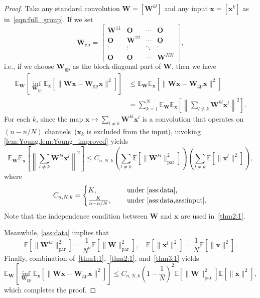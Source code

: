 \documentclass[10pt,a4paper]{amsart}
\numberwithin{equation}{section}
\theoremstyle{remark}
\newcommand\bO{\mathbf{O}}
\newcommand\bW{\mathbf{W}}
\newcommand\bx{\mathbf{x}}
\newcommand\bbE{\mathbb{E}}
\newcommand\gp{\mathrm{gp}}
\newcommand\param{\mathrm{par}}
\begin{document}
\begin{proof}
Take any standard convolution $\bW = [\bW^{kl}]$ and any input $\bx = [\bx^k]$ as in~\eqref{eqn:full_group}.
If we set
\begin{equation*}
    \bW_{\gp} = \begin{bmatrix} \bW^{11} & \bO & \cdots & \bO \\
        \bO & \bW^{22} & \cdots & \bO \\
        \vdots & \vdots & \ddots & \vdots \\
        \bO & \bO & \cdots & \bW^{NN} \end{bmatrix},
\end{equation*}
i.e., if we choose $\bW_{\gp}$ as the block-diagonal part of $\bW$, then we have
\begin{align}
    \label{thm1:1}
    \bbE_{\bW} \left[ \inf_{\bW_{\gp}} \bbE_{\bx} \left[ \| \bW \bx - \bW_{\gp} \bx \|^2 \right] \right]
    &\leq \bbE_{\bW} \bbE_{\bx} \left[ \| \bW \bx - \bW_{\gp} \bx \|^2 \right] \nonumber \\
    &= \sum_{k=1}^N \bbE_{\bW} \bbE_{\bx} \left[ \left\| \sum_{l \neq k} \bW^{kl} \bx^l \right\|^2 \right].
\end{align}
For each $k$, since the map $\bx \mapsto \sum_{l \neq k} \bW^{kl} \bx^l$ is a convolution that operates on $(n - n/N)$ channels~($\bx_k$ is excluded from the input), invoking \cref{lem:Young,lem:Young_improved} yields
\begin{equation}
    \label{thm2:1}
    \bbE_{\bW} \bbE_{\bx} \left[ \left\| \sum_{l \neq k} \bW^{kl} \bx^l \right\|^2 \right] \leq C_{n,N,k} \left( \sum_{l \neq k} \bbE \left[ \| \bW^{kl} \|_{\param}^2 \right] \right) \left( \sum_{l \neq k} \bbE \left[ \| \bx^l \|^2 \right] \right),
\end{equation}
where
\begin{equation}
\label{C}
C_{n,N,k} = \begin{cases}
K, & \quad \text{ under \cref{ass:data},} \\
\frac{K}{n-n/N}, & \quad \text{ under \cref{ass:data,ass:input}.}
\end{cases}
\end{equation}
Note that the independence condition between $\bW$ and $\bx$ are used in~\eqref{thm2:1}.

Meanwhile, \cref{ass:data} implies that
\begin{equation}
    \label{thm3:1}
    \bbE \left[ \| \bW^{kl} \|_{\param}^2 \right] = \frac{1}{N^2} \bbE \left[ \| \bW \|_{\param}^2 \right], \quad
    \bbE \left[ \| \bx^l \|^2 \right] = \frac{1}{N} \bbE \left[ \| \bx \|^2 \right].
\end{equation}
Finally, combination of~\eqref{thm1:1},~\eqref{thm2:1}, and~\eqref{thm3:1} yields
\begin{equation*}
    \bbE_{\bW} \left[ \inf_{\bW_{\gp}} \bbE_{\bx} \left[ \| \bW \bx - \bW_{\gp} \bx \|^2 \right] \right]
    \leq C_{n,N,k} \left( 1 - \frac{1}{N} \right)^2 \bbE \left[ \| \bW \|_{\param}^2 \right] \bbE \left[ \| \bx \|^2 \right],
\end{equation*}
which completes the proof.
\end{proof}
\end{document}
